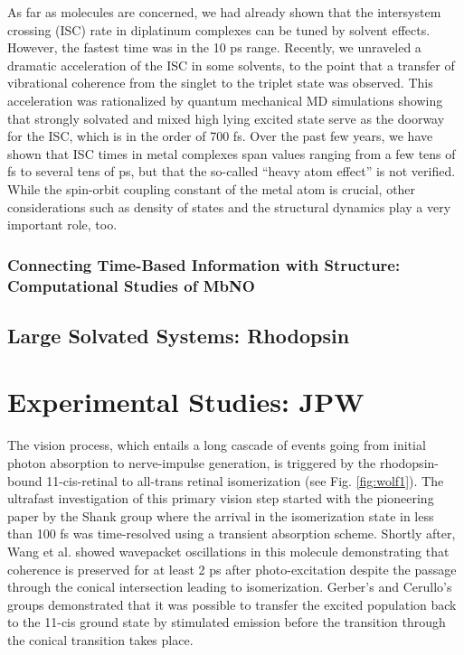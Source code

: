 \documentclass[journal=jacsat,manuscript=article]{achemso}
\begin{document}
As far as molecules are concerned, we had already shown that the
intersystem crossing (ISC) rate in diplatinum complexes can be tuned
by solvent effects.\cite{chergui.jacs.2011} However, the fastest time
was in the 10 ps range. Recently, we unraveled a dramatic acceleration
of the ISC in some solvents, to the point that a transfer of
vibrational coherence from the singlet to the triplet state was
observed.\cite{monni:2017,monni:rev} This acceleration was
rationalized by quantum mechanical MD simulations showing that
strongly solvated and mixed high lying excited state serve as the
doorway for the ISC, which is in the order of 700 fs. Over the past
few years, we have shown that ISC times in metal complexes span values
ranging from a few tens of fs to several tens of ps, but that the
so-called “heavy atom effect” is not verified. While the spin-orbit
coupling constant of the metal atom is crucial, other considerations
such as density of states and the structural dynamics play a very
important role, too.\cite{chergui:2012,chergui:2015}


\subsubsection{Connecting Time-Based Information with Structure: Computational Studies of MbNO}


\subsection{Large Solvated Systems: Rhodopsin}

\section{Experimental Studies: JPW}
The vision process, which entails a long cascade of events going from
initial photon absorption to nerve-impulse generation, is triggered by
the rhodopsin-bound 11-cis-retinal to all-trans retinal isomerization
(see Fig. \ref{fig:wolf1}). The ultrafast investigation of this
primary vision step started with the pioneering paper by the Shank
group where the arrival in the isomerization state in less than 100 fs
was time-resolved using a transient absorption
scheme.\cite{schonlein:1991} Shortly after, Wang et al. showed
wavepacket oscillations in this molecule demonstrating that coherence
is preserved for at least 2 ps after photo-excitation despite the
passage through the conical intersection leading to
isomerization.\cite{wang:1994} Gerber’s and Cerullo’s groups
demonstrated that it was possible to transfer the excited population
back to the 11-cis ground state by stimulated emission before the
transition through the conical transition takes
place.\cite{polli:2010,gerber:2006}\\
\end{document}
